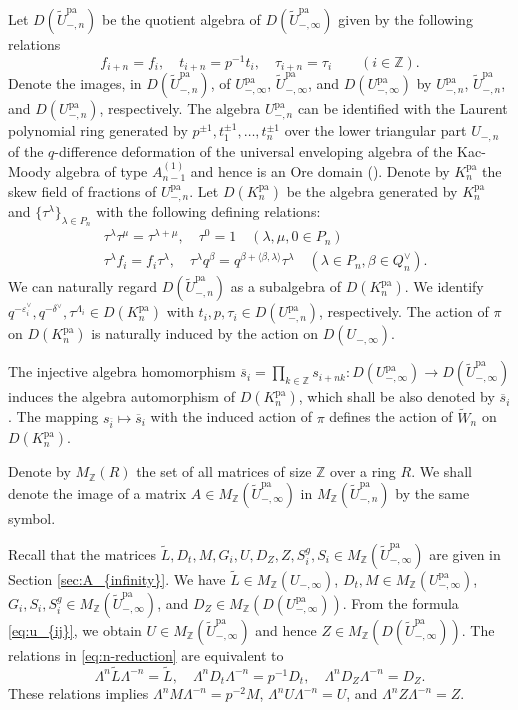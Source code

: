 \documentclass[12pt,twoside]{article}
\newcommand\tL{{\widetilde L}}
\newcommand\tU{{\widetilde U}}
\newcommand\tW{{\widetilde W}}
\newcommand\bars{{\overline s}}
\newcommand\eps{\varepsilon}
\newcommand\epsv{\eps^\vee}
\newcommand\deltav{\delta^\vee}
\newcommand\Qv{Q^\vee}
\newcommand\bra{\langle}
\newcommand\ket{\rangle}
\newcommand\pa{{\mathrm{pa}}}
\newcommand\Z{{\mathbb Z}} %
\theoremstyle{plain} %
\theoremstyle{definition} %
\theoremstyle{definition} %
\numberwithin{theorem}{section}
\numberwithin{equation}{section}
\numberwithin{figure}{section}
\numberwithin{table}{section}
\newcommand\secref[1]{Section \ref{#1}}
\begin{document}
Let $D(\tU_{-,n}^\pa)$ be the quotient algebra of $D(\tU_{-,\infty}^\pa)$
given by the following relations
\begin{equation}
 f_{i+n} = f_i, \quad t_{i+n} = p^{-1}t_i, \quad \tau_{i+n}=\tau_i
 \qquad (i\in\Z).
 \label{eq:n-reduction}
\end{equation}
Denote the images, in $D(\tU_{-,n}^\pa)$, of 
$U_{-,\infty}^\pa$, $\tU_{-,\infty}^\pa$, and $D(U_{-,\infty}^\pa)$ 
by $U_{-,n}^\pa$, $\tU_{-,n}^\pa$, and $D(U_{-,n}^\pa)$,
respectively.
The algebra $U_{-,n}^\pa$ can be identified with 
the Laurent polynomial ring 
generated by $p^{\pm1},t_1^{\pm1},\ldots,t_n^{\pm1}$
over the lower triangular part $U_{-,n}$ of 
the $q$-difference deformation of the universal enveloping algebra 
of the Kac-Moody algebra of type $A^{(1)}_{n-1}$
and hence is an Ore domain (\cite{Kuroki2008}).
Denote by $K_n^\pa$ the skew field of fractions of $U_{-,n}^\pa$.
Let $D(K_n^\pa)$ be the algebra generated by $K_n^\pa$
and $\{\tau^\lambda\}_{\lambda\in P_n}$ 
with the following defining relations:
\begin{align*}
 &
 \tau^\lambda \tau^\mu = \tau^{\lambda+\mu}, \quad
 \tau^0 = 1
 \quad (\lambda,\mu,0\in P_n)
 \\ &
 \tau^\lambda f_i = f_i \tau^\lambda, \quad
 \tau^\lambda q^\beta = q^{\beta+\bra\beta,\lambda\ket}\tau^\lambda
 \quad (\lambda\in P_n, \beta\in\Qv_n).
\end{align*}
We can naturally regard $D(\tU_{-,n}^\pa)$
as a subalgebra of $D(K_n^\pa)$.
We identify $q^{-\epsv_i},q^{-\deltav},\tau^{\Lambda_i}\in D(K_n^\pa)$
with $t_i,p,\tau_i\in D(U_{-,n}^\pa)$, respectively.
The action of $\pi$ on $D(K_n^\pa)$ is naturally induced
by the action on $D(U_{-,\infty})$.

The injective algebra homomorphism 
$\bars_i=\prod_{k\in\Z}s_{i+nk}:D(U_{-,\infty}^\pa)\to D(\tU_{-,\infty}^\pa)$
induces the algebra automorphism of $D(K_n^\pa)$, 
which shall be also denoted by $\bars_i$.
The mapping $s_{\overline{i}}\mapsto\bars_i$ with the induced action of $\pi$
defines the action of $\tW_n$ on $D(K_n^\pa)$.

Denote by $M_\Z(R)$ the set of all matrices of size $\Z$ over a ring $R$.
We shall denote the image of a matrix $A\in M_\Z(\tU_{-,\infty}^\pa)$
in $M_\Z(\tU_{-,n}^\pa)$ by the same symbol.

Recall that the matrices 
$\tL, D_t, M, G_i, U, D_Z, Z, S_i^g, S_i \in M_\Z(\tU_{-,\infty}^\pa)$
are given in \secref{sec:A_{infinity}}.
We have $\tL\in M_\Z(U_{-,\infty})$, $D_t,M\in M_\Z(U_{-,\infty}^\pa)$,
$G_i, S_i, S_i^g \in M_\Z(\tU_{-,\infty}^\pa)$, 
and $D_Z\in M_\Z(D(U_{-,\infty}^\pa))$.
From the formula \eqref{eq:u_{ij}}, we obtain $U\in M_\Z(\tU_{-,\infty}^\pa)$
and hence $Z\in M_\Z(D(\tU_{-,\infty}^\pa))$.
The relations in \eqref{eq:n-reduction} are equivalent to
\begin{equation*}
 \Lambda^n \tL \Lambda^{-n} = \tL, \quad
 \Lambda^n D_t \Lambda^{-n} = p^{-1} D_t, \quad
 \Lambda^n D_Z \Lambda^{-n} = D_Z.
\end{equation*}
These relations implies $\Lambda^n M \Lambda^{-n}=p^{-2}M$, 
$\Lambda^n U \Lambda^{-n} = U$, and $\Lambda^n Z \Lambda^{-n} = Z$.
\end{document}
